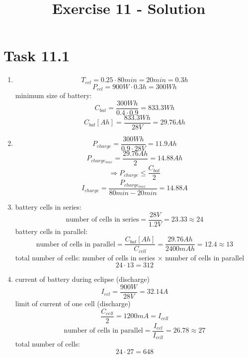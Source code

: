 \documentclass[a4paper,12pt]{article}
\title{Exercise 11 - Solution}
\author{}
\date{}
\begin{document}
\maketitle

\section*{Task 11.1}
\begin{enumerate}
 \item \[T_{ecl} = 0.25\cdot 80min = 20min = 0.3h\]
\[P_{ecl} = 900W\cdot 0.3h = 300Wh \]
minimum size of battery: 
\[C_{bat} = \frac{300Wh}{0.4\cdot 0.9} = 833.3Wh\]
\[C_{bat}[Ah] = \frac{833.3Wh}{28V} = 29.76Ah\]
 \item \[P_{charge} = \frac{300Wh}{0.9\cdot 28V} = 11.9Ah\]
 \[P_{charge_{max}} = \frac{29.76Ah}{2} = 14.88Ah\]
 \[\Rightarrow P_{charge} \leq \frac{C_{bat}}{2}\]
 \[I_{charge} = \frac{P_{charge_{max}}}{80min - 20min} = 14.88A\]
 \item battery cells in series: \[\text{number of cells in series} = \frac{28V}{1.2V} = 23.33 \approx 24\]
 battery cells in parallel: \[\text{number of cells in parallel}= \frac{C_{bat}[Ah]}{C_{cell}} = \frac{29.76Ah}{2400mAh} = 12.4 \approx 13\]
 total number of cells: number of cells in series $\times$ number of cells in parallel \[24\cdot 13 = 312\]
 \item current of battery during eclipse (discharge)
 \[I_{ecl} = \frac{900W}{28V} = 32.14A\]
 limit of current of one cell (discharge)
 \[\frac{C_{cell}}{2} = 1200mA = I_{cell}\]
 \[\text{number of cells in parallel} = \frac{I_{ecl}}{I_{cell}} = 26.78 \approx 27\]
 total number of cells: \[24\cdot 27 = 648\]
\end{enumerate}
\end{document}
